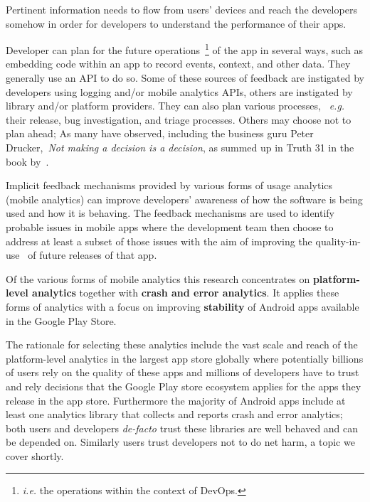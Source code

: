 Pertinent information needs to flow from users' devices and reach the developers somehow in order for developers to understand the performance of their apps. 

Developer can plan for the future operations~\footnote{\emph{i.e.} the operations within the context of DevOps.} of the app in several ways, such as embedding code within an app to record events, context, and other data. They generally use an API to do so. Some of these sources of feedback are instigated by developers using logging and/or mobile analytics APIs, others are instigated by library and/or platform providers.
%
They can also plan various processes, ~\emph{e.g.} their release, bug investigation, and triage processes. Others may choose not to plan ahead; As many have observed, including the business guru Peter Drucker,~\emph{Not making a decision is a decision}, as summed up in Truth 31 in the book by~\cite{gunther2013truth_about_better_decision_making}.

Implicit feedback mechanisms provided by various forms of usage analytics (mobile analytics) can improve developers' awareness of how the software is being used and how it is behaving.  
The feedback mechanisms are used to identify probable issues in mobile apps where the development team then choose to address at least a subset of those issues with the aim of improving the quality-in-use~\citep{bevan1999_89_quality_in_use_meeting_user_needs_for_quality} of future releases of that app. 

Of the various forms of mobile analytics this research concentrates on \textbf{platform-level analytics} together with \textbf{crash and error analytics}. It applies these forms of analytics with a focus on improving \textbf{stability} of Android apps available in the Google Play Store.


The rationale for selecting these analytics include the vast scale and reach of the platform-level analytics in the largest app store globally where potentially billions of users rely on the quality of these apps and millions of developers have to trust and rely decisions that the Google Play store ecosystem applies for the apps they release in the app store. Furthermore the majority of Android apps include at least one analytics library that collects and reports crash and error analytics; both users and developers \emph{de-facto} trust these libraries are well behaved and can be depended on. Similarly users trust developers not to do net harm, a topic we cover shortly.

